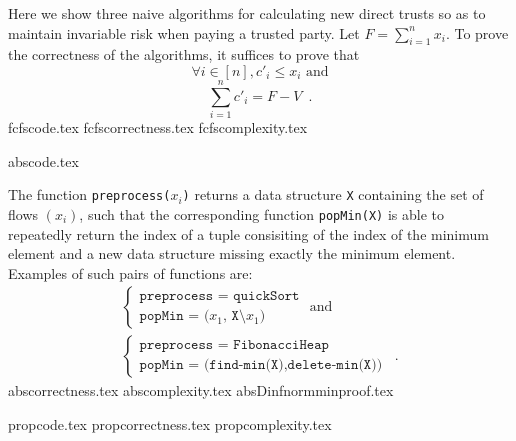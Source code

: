 \documentclass[11pt]{llncs}
\begin{document}
  Here we show three naive algorithms for calculating new direct trusts so as to maintain invariable risk when paying
  a trusted party. Let $F = \sum\limits_{i=1}^{n}x_i$. To prove the correctness of the algorithms, it suffices to prove that
  \begin{equation}
  \label{naive:req1}
     \forall i \in [n], c'_i \leq x_i \mbox{ and}
  \end{equation}
  \begin{equation}
  \label{naive:req2}
     \sum\limits_{i=1}^{n}c'_i = F - V \enspace.
  \end{equation}
  {fcfscode.tex}
  {fcfscorrectness.tex}
  {fcfscomplexity.tex}

  {abscode.tex}

  The function \texttt{preprocess(}$x_i$\texttt{)} returns a data structure \texttt{X} containing the set of flows
  $\left(x_i\right)$, such that the corresponding function \texttt{popMin(X)} is able to repeatedly return the index of a
  tuple consisiting of the index of the minimum element and a new data structure missing exactly the minimum element.
  Examples of such pairs of functions are:
  \begin{equation*}
  \begin{gathered}
    \begin{cases}
      \texttt{preprocess = quickSort} \\
      \texttt{popMin = (}x_1\texttt{, X}\setminus x_1\texttt{)}
    \end{cases}
    \mbox{ and} \\
    \begin{cases}
      \texttt{preprocess = FibonacciHeap} \\
      \texttt{popMin = (find-min(X),delete-min(X))}
    \end{cases} \enspace.
  \end{gathered}
  \end{equation*}
  {abscorrectness.tex}
  {abscomplexity.tex}
  {absDinfnormminproof.tex}

  {propcode.tex}
  {propcorrectness.tex}
  {propcomplexity.tex}
\end{document}
